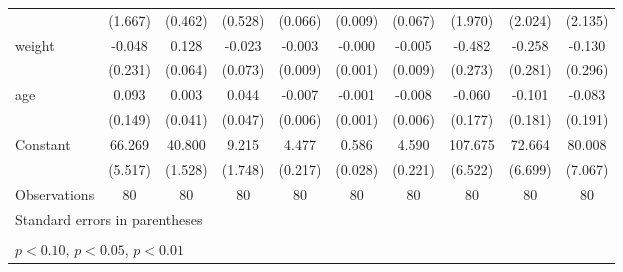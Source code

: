 \begin{table}[htbp]
\begin{tabular}{l*{9}{c}}
                    &     (1.667)         &     (0.462)         &     (0.528)         &     (0.066)         &     (0.009)         &     (0.067)         &     (1.970)         &     (2.024)         &     (2.135)         \\
\addlinespace
weight              &      -0.048         &       0.128\sym{**} &      -0.023         &      -0.003         &      -0.000         &      -0.005         &      -0.482\sym{*}  &      -0.258         &      -0.130         \\
                    &     (0.231)         &     (0.064)         &     (0.073)         &     (0.009)         &     (0.001)         &     (0.009)         &     (0.273)         &     (0.281)         &     (0.296)         \\
\addlinespace
age                 &       0.093         &       0.003         &       0.044         &      -0.007         &      -0.001         &      -0.008         &      -0.060         &      -0.101         &      -0.083         \\
                    &     (0.149)         &     (0.041)         &     (0.047)         &     (0.006)         &     (0.001)         &     (0.006)         &     (0.177)         &     (0.181)         &     (0.191)         \\
\addlinespace
Constant            &      66.269\sym{***}&      40.800\sym{***}&       9.215\sym{***}&       4.477\sym{***}&       0.586\sym{***}&       4.590\sym{***}&     107.675\sym{***}&      72.664\sym{***}&      80.008\sym{***}\\
                    &     (5.517)         &     (1.528)         &     (1.748)         &     (0.217)         &     (0.028)         &     (0.221)         &     (6.522)         &     (6.699)         &     (7.067)         \\
\midrule
Observations        &          80         &          80         &          80         &          80         &          80         &          80         &          80         &          80         &          80         \\
\bottomrule
\multicolumn{10}{l}{\footnotesize Standard errors in parentheses}\\
\multicolumn{10}{l}{\footnotesize  }\\
\multicolumn{10}{l}{\footnotesize \sym{*} \(p<0.10\), \sym{**} \(p<0.05\), \sym{***} \(p<0.01\)}\\
\end{tabular}
\end{table}
